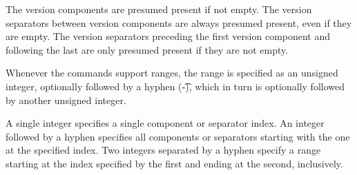 The version components are presumed present if not empty. The version separators between version
components are always presumed present, even if they are empty. The version separators preceding
the first version component and following the last are only presumed present if they are not empty.

Whenever the commands support ranges, the range is specified as an unsigned integer, optionally
followed by a hyphen (\t{-}), which in turn is optionally followed by another unsigned integer.

A single integer specifies a single component or separator index. An integer followed by a hyphen
specifies all components or separators starting with the one at the specified index. Two integers
separated by a hyphen specify a range starting at the index specified by the first and ending at
the second, inclusively.


